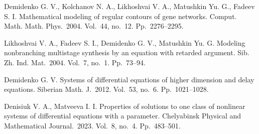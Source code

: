 \documentclass[12pt]{llncs}
\begin{document}

\begin{thebibliography}{3} %
 Demidenko G. V., Kolchanov N. A., Likhoshvai V. A., Matushkin Yu. G., Fadeev S. I. Mathematical modeling of regular contours of gene networks. Comput. Math. Math. Phys.~2004. Vol.~44, no.~12. Pp.~2276--2295.

  Likhoshvai V. A., Fadeev S. I., Demidenko G. V., Matushkin Yu. G. Modeling nonbranching multistage synthesis by an equation with retarded argument. Sib. Zh. Ind. Mat.~2004. Vol.~7,  no.~1. Pp.~73--94.

 Demidenko G. V. Systems of differential equations of higher dimension and delay equations. Siberian Math. J.~2012. Vol.~53, no.~6. Pp.~1021--1028.

 Denisiuk V. A., Matveeva I. I. Properties of solutions to one class of nonlinear systems of differential equations with a parameter. Chelyabinsk Physical and Mathematical Journal.~2023. Vol.~8, no.~4. Pp.~483--501.

\end{thebibliography}
\end{document}
